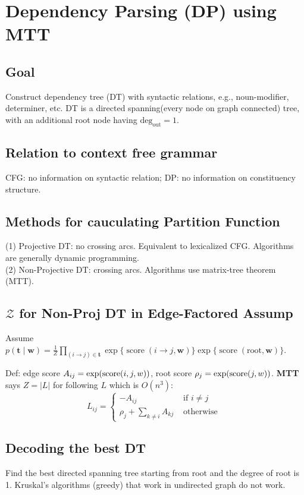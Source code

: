 \section{Dependency Parsing (DP) using MTT}

\subsection*{Goal} Construct dependency tree (DT) with syntactic relations, e.g., noun-modifier, determiner, etc. DT is a directed spanning(every node on graph connected) tree, with an additional root node having $\mathrm{deg}_{\mathrm{out}}=1$.

\subsection*{Relation to context free grammar}
CFG: no information on syntactic relation; DP: no information on constituency structure. 

\subsection*{Methods for cauculating Partition Function} 
(1) Projective DT: no crossing arcs. Equivalent to lexicalized CFG. Algorithms are generally dynamic programming. \\
(2) Non-Projective DT: crossing arcs. Algorithms use matrix-tree theorem (MTT).


\subsection*{$\mathcal{Z}$ for Non-Proj DT in Edge-Factored Assump}
Assume $p(\mathbf{t} \mid \mathbf{w})=\frac{1}{Z} \prod_{(i \rightarrow j) \in \mathbf{t}} \exp \{\operatorname{score}(i\to j, \mathbf{w})\} \exp \{\operatorname{score}(\mathrm{root}, \mathbf{w})\}$.

Def: edge score $A_{ij}=\exp(\text{score}(i,j,w))$, root score $\rho_j = \exp(\text{score}(j,w))$. \textbf{MTT} says $Z=|L|$ for following $L$ which is $O(n^3)$:
\vspace{-0.3cm}
$$L_{i j}= \begin{cases}-A_{i j} & \text { if } i \neq j \\ \rho_{j}+\sum_{k \neq i} A_{k j} & \text { otherwise }\end{cases}$$
\vspace{-0.3cm}

\subsection*{Decoding the best DT}
Find the best directed spanning tree starting from root and the degree of root is 1. \; Kruskal's algorithms (greedy) that work in undirected graph do not work.

